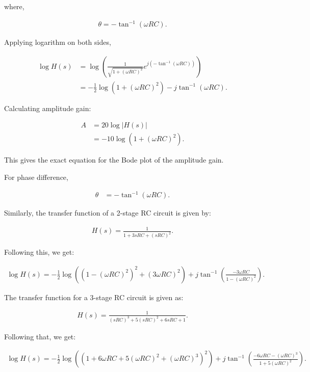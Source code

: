 \documentclass{article}
\begin{document}
where,

\begin{align*}
    \theta = -\tan^{-1}(\omega RC).
\end{align*}

Applying logarithm on both sides,

\begin{align*}
    \log H(s) &= \log\left(\frac{1}{\sqrt{1+(\omega RC)^2}} e^{j(-\tan^{-1}(\omega RC))}\right)\\
              &= -\frac{1}{2}\log(1+(\omega RC)^2) - j\tan^{-1}(\omega RC).
\end{align*}

Calculating amplitude gain:

\begin{align*}
    A &= 20 \log\left| H(s) \right|\\
    &= -10 \log(1+(\omega RC)^2).
\end{align*}

This gives the exact equation for the Bode plot of the amplitude gain.

For phase difference,

\begin{align*}
    \theta &= -\tan^{-1}(\omega RC).
\end{align*}

Similarly, the transfer function of a 2-stage RC circuit is given by:

\begin{align*}
    H(s) = \frac{1}{1 + 3sRC + (sRC)^2}.
\end{align*}

Following this, we get:

\begin{align*}
    \log H(s) = -\frac{1}{2} \log \left( (1-(\omega RC)^2)^2 + (3\omega RC)^2 \right) + j \tan^{-1} \left( \frac{-3\omega RC}{1-(\omega RC)^2} \right).
\end{align*}

The transfer function for a 3-stage RC circuit is given as:

\begin{align*}
    H(s) = \frac{1}{(sRC)^3 + 5(sRC)^2 + 6sRC + 1}.
\end{align*}

Following that, we get:

\begin{align*}
    \log H(s) = -\frac{1}{2} \log \left( \left( 1 + 6\omega RC + 5(\omega RC)^2 + (\omega RC)^3 \right)^2 \right) + j \tan^{-1} \left( \frac{-6\omega RC - (\omega RC)^3}{1 + 5(\omega RC)^2} \right).
\end{align*}
\end{document}
